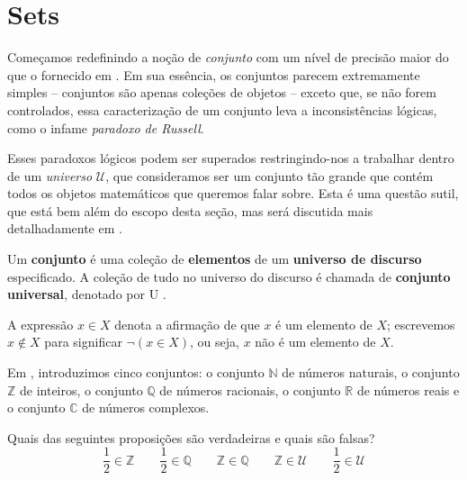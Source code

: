 \section{Sets}

Começamos redefinindo a noção de \textit{conjunto} com um nível de precisão maior do que o fornecido em . Em sua essência, os conjuntos parecem extremamente simples – conjuntos são apenas coleções de objetos – exceto que, se não forem controlados, essa caracterização de um conjunto leva a inconsistências lógicas, como o infame \textit{paradoxo de Russell}.

Esses paradoxos lógicos podem ser superados restringindo-nos a trabalhar dentro de um \textit{universo} $\mathcal{U}$, que consideramos ser um conjunto tão grande que contém todos os objetos matemáticos que queremos falar sobre. Esta é uma questão sutil, que está bem além do escopo desta seção, mas será discutida mais detalhadamente em .

\begin{definition}
\label{defSet}
Um \textbf{conjunto} é uma coleção de \textbf{elementos} de um \textbf{universo de discurso} especificado. A coleção de tudo no universo do discurso é chamada de \textbf{conjunto universal}, denotado por U .

A expressão $x \in X$  denota a afirmação de que $x$ é um elemento de $ X$; escrevemos $x \not \in X$  para significar $\neg (x \in X)$, ou seja, $x$ não é um elemento de $X$.
\end{definition}

\begin{example}
Em , introduzimos cinco conjuntos: o conjunto $\mathbb{N}$ de números naturais, o conjunto $\mathbb{Z}$ de inteiros, o conjunto $\mathbb{Q}$ de números racionais, o conjunto $\mathbb{R}$ de números reais e o conjunto $\mathbb{C}$ de números complexos.
\end{example}

\begin{exercise}
Quais das seguintes proposições são verdadeiras e quais são falsas?
\[ \frac{1}{2} \in \mathbb{Z} \qquad \frac{1}{2} \in \mathbb{Q} \qquad \mathbb{Z} \in \mathbb{Q} \qquad \mathbb{Z} \in \mathcal{U} \qquad \frac{1}{2} \in \mathcal{U} \]
\end{exercise}

